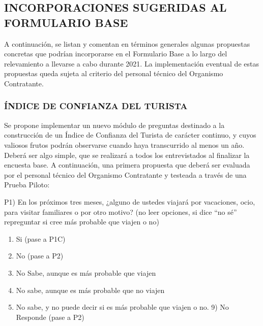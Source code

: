 \documentclass[
  openany]{book}
\providecommand{\tightlist}{%
  \setlength{\itemsep}{0pt}\setlength{\parskip}{0pt}}
\begin{document}
\hypertarget{incorporaciones-sugeridas-al-formulario-base}{%
\subsection{\texorpdfstring{\textbf{INCORPORACIONES SUGERIDAS AL FORMULARIO BASE}}{INCORPORACIONES SUGERIDAS AL FORMULARIO BASE}}\label{incorporaciones-sugeridas-al-formulario-base}}

A continuación, se listan y comentan en términos generales algunas propuestas concretas que podrían incorporarse en el Formulario Base a lo largo del relevamiento a llevarse a cabo durante 2021.
La implementación eventual de estas propuestas queda sujeta al criterio del personal técnico del Organismo Contratante.

\hypertarget{uxedndice-de-confianza-del-turista}{%
\subsubsection{\texorpdfstring{\textbf{ÍNDICE DE CONFIANZA DEL TURISTA}}{ÍNDICE DE CONFIANZA DEL TURISTA}}\label{uxedndice-de-confianza-del-turista}}

Se propone implementar un nuevo módulo de preguntas destinado a la construcción de un Índice de Confianza del Turista de carácter continuo, y cuyos valiosos frutos podrán observarse cuando haya transcurrido al menos un año.
Deberá ser algo simple, que se realizará a todos los entrevistados al finalizar la encuesta base.
A continuación, una primera propuesta que deberá ser evaluada por el personal técnico del Organismo Contratante y testeada a través de una Prueba Piloto:

P1) En los próximos tres meses, ¿alguno de ustedes viajará por vacaciones, ocio, para visitar familiares o por otro motivo?
(no leer opciones, si dice ``no sé'' repreguntar si cree más probable que viajen o no)

\begin{enumerate}
\def\labelenumi{\arabic{enumi})}
\tightlist
\item
  Si (pase a P1C)
\item
  No (pase a P2)
\item
  No Sabe, aunque es más probable que viajen
\item
  No sabe, aunque es más probable que no viajen
\item
  No sabe, y no puede decir si es más probable que viajen o no. 9) No Responde (pase a P2)
\end{enumerate}
\end{document}

